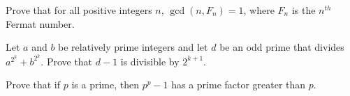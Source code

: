 \documentclass{subfile}
\begin{document}
	\begin{problem}
		Prove that for all positive integers $n$, $\gcd(n, F_n) = 1$, where $F_n$ is the $n^{th}$ Fermat number. %
	\end{problem}


	\begin{problem}
		Let $a$ and $b$ be relatively prime integers and let $d$ be an odd prime that divides $a^{2^{k}}+b^{2^{k}}$. Prove that $d-1$ is divisible by $2^{k+1}$. %
	\end{problem}


	\begin{problem}
		Prove that if $p$ is a prime, then $p^p-1$ has a prime factor greater than $p$. %
	\end{problem}
\end{document}
